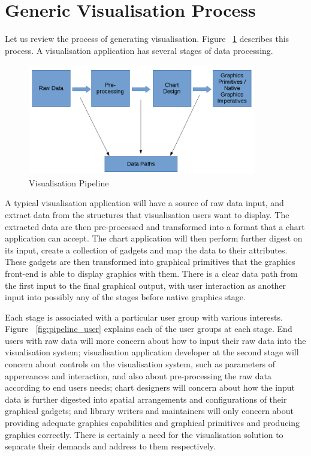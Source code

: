 \documentclass[11pt, a4paper]{report}
\begin{document}
\section[Study of a typical process of visualisation]{Generic Visualisation Process}
Let us review the process of generating visualisation. Figure ~\ref{fig:pipeline} describes this process. A visualisation application has several stages of data processing.
\begin{figure}[H]
\centering
\includegraphics[width=10cm]{fig3_pipeline}
\caption{Visualisation Pipeline}
\label{fig:pipeline}
\end{figure}
A typical visualisation application will have a source of raw data input, and extract data from the structures that visualisation users want to display. The extracted data are then pre-processed and transformed into a format that a chart application can accept. The chart application will then perform further digest on its input, create a collection of gadgets and map the data to their attributes. These gadgets are then transformed into graphical primitives that the graphics front-end is able to display graphics with them. There is a clear data path from the first input to the final graphical output, with user interaction as another input into possibly any of the stages before native graphics stage. 

Each stage is associated with a particular user group with various interests. Figure ~\ref{fig:pipeline_user} explains each of the user groups at each stage. End users with raw data will more concern about how to input their raw data into the visualisation system; visualisation application developer at the second stage will concern about controls on the visualisation system, such as parameters of appereances and interaction, and also about pre-processing the raw data according to end users needs; chart designers will concern about how the input data is further digested into spatial arrangements and configurations of their graphical gadgets; and library writers and maintainers will only concern about providing adequate graphics capabilities and graphical primitives and producing graphics correctly. There is certainly a need for the visualisation solution to separate their demands and address to them respectively.
\end{document}
